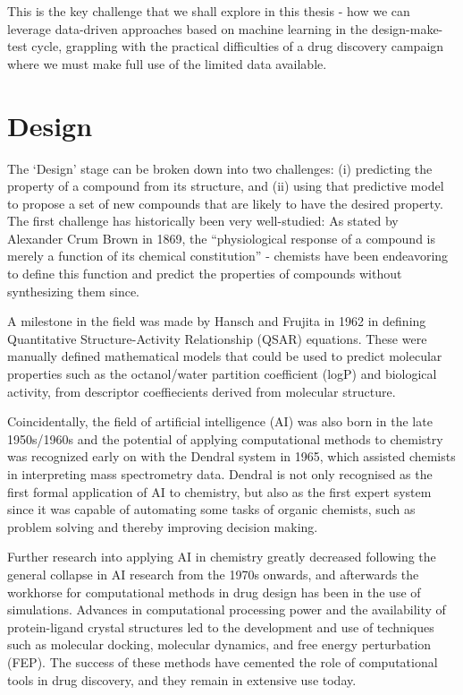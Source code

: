 This is the key challenge that we shall explore in this thesis - how we can leverage data-driven approaches based on machine learning in the design-make-test cycle, grappling with the practical difficulties of a drug discovery campaign where we must make full use of the limited data available.

\section*{Design}

The `Design' stage can be broken down into two challenges: (i) predicting the property of a compound from its structure, and (ii) using that predictive model to propose a set of new compounds that are likely to have the desired property. The first challenge has historically been very well-studied: As stated by Alexander Crum Brown in 1869, the ``physiological response of a compound is merely a function of its chemical constitution'' - chemists have been endeavoring to define this function and predict the properties of compounds without synthesizing them since.

A milestone in the field was made by Hansch and Frujita in 1962 in defining Quantitative Structure-Activity Relationship (QSAR) equations. These were manually defined mathematical models that could be used to predict molecular properties such as the octanol/water partition coefficient (logP) and biological activity, from descriptor coeffiecients derived from molecular structure.

Coincidentally, the field of artificial intelligence (AI) was also born in the late 1950s/1960s and the potential of applying computational methods to chemistry was recognized early on with the Dendral system in 1965, which assisted chemists in interpreting mass spectrometry data. Dendral is not only recognised as the first formal application of AI to chemistry, but also as the first expert system since it was capable of automating some tasks of organic chemists, such as problem solving and thereby improving decision making.

Further research into applying AI in chemistry greatly decreased following the general collapse in AI research from the 1970s onwards, and afterwards the workhorse for computational methods in drug design has been in the use of simulations. Advances in computational processing power and the availability of protein-ligand crystal structures led to the development and use of techniques such as molecular docking, molecular dynamics, and free energy perturbation (FEP). The success of these methods have cemented the role of computational tools in drug discovery, and they remain in extensive use today.

